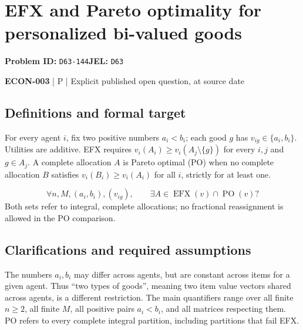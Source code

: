 \documentclass[11pt,a4paper]{article}
\begin{document}
\section*{EFX and Pareto optimality for personalized bi-valued goods}
\textbf{Problem ID:} \texttt{D63-144}\quad \textbf{JEL:} \texttt{D63}\par
\label{problem:OP-0590}


\label{audited:ECON-003}

{\sffamily\small\color{muted}\textbf{ECON-003} | P | Explicit published open question, at source date\par}

\subsection*{Definitions and formal target}

For every agent $i$, fix two positive numbers $a_i<b_i$; each good $g$ has $v_{ig}\in\{a_i,b_i\}$. Utilities are additive. EFX requires $v_i(A_i)\geq v_i(A_j\setminus\{g\})$ for every $i,j$ and $g\in A_j$. A complete allocation $A$ is Pareto optimal (PO) when no complete allocation $B$ satisfies $v_i(B_i)\geq v_i(A_i)$ for all $i$, strictly for at least one.

\[
 \forall n,M,(a_i,b_i),(v_{ig}),\qquad
 \exists A\in\operatorname{EFX}(v)\cap\operatorname{PO}(v)?
\]
Both sets refer to integral, complete allocations; no fractional reassignment is allowed in the PO comparison.

\subsection*{Clarifications and required assumptions}

The numbers $a_i,b_i$ may differ across agents, but are constant across items for a given agent. Thus ``two types of goods'', meaning two item value vectors shared across agents, is a different restriction. The main quantifiers range over all finite $n\geq2$, all finite $M$, all positive pairs $a_i<b_i$, and all matrices respecting them. PO refers to every complete integral partition, including partitions that fail EFX.
\end{document}

